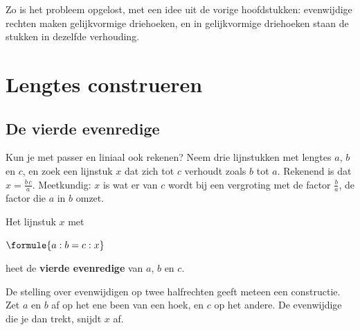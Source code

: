 Zo is het probleem opgelost, met een idee uit de vorige hoofdstukken: evenwijdige rechten maken gelijkvormige driehoeken, en in gelijkvormige driehoeken staan de stukken in dezelfde verhouding.

\section{Lengtes construeren}

\subsection{De vierde evenredige}

Kun je met passer en liniaal ook rekenen? Neem drie lijnstukken met lengtes $a$, $b$ en $c$, en zoek een lijnstuk $x$ dat zich tot $c$ verhoudt zoals $b$ tot $a$. Rekenend is dat $x = \tfrac{b\,c}{a}$. Meetkundig: $x$ is wat er van $c$ wordt bij een vergroting met de factor $\tfrac{b}{a}$, de factor die $a$ in $b$ omzet.

\begin{theorie}
Het lijnstuk $x$ met

\vspace{1mm}
\qquad $\formule{a : b = c : x}$

\vspace{1mm}
heet de \textbf{\textcolor{accent}{vierde evenredige}} van $a$, $b$ en $c$.
\end{theorie}

De stelling over evenwijdigen op twee halfrechten geeft meteen een constructie. Zet $a$ en $b$ af op het ene been van een hoek, en $c$ op het andere. De evenwijdige die je dan trekt, snijdt $x$ af.

